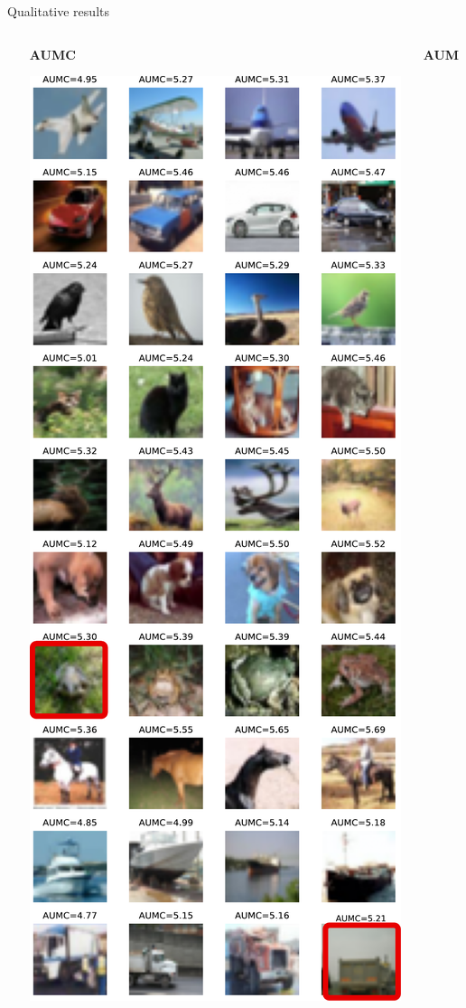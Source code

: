 \begin{frame}{Qualitative results}{}
\begin{columns}
\begin{column}{.3\textwidth}
        \end{column}

        \begin{column}{.3\textwidth}
            \textbf{AUMC}

            \vspace{.25cm}

            \centering
               \includegraphics[width=\textwidth, clip, trim={0cm 0cm 0cm 12cm}]{../chapters/images/AUMC_yang_cut.pdf}
        \end{column}
        \begin{column}{.3\textwidth}
            \textbf{AUM}


\end{column}
\end{columns}
\end{frame}
